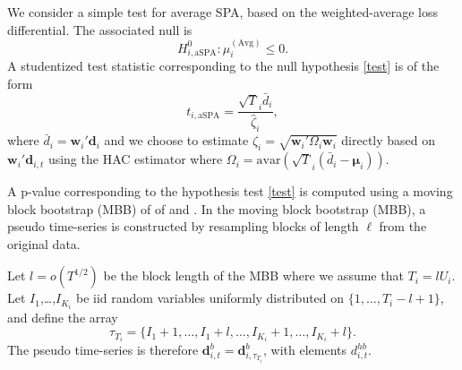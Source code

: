\documentclass[11pt]{article}
\def\mbf#1{\mathbf{#1}} %
\theoremstyle{definition}
\begin{document}
We consider a simple test for average SPA, based on the weighted-average loss differential. The associated null is
\begin{equation} \label{test}
	H_{i,\text{aSPA}}^0: \mu^{(\text{Avg})}_i \leq 0.
\end{equation}
A studentized test statistic corresponding to the null hypothesis \eqref{test} is of the form 
\begin{equation} \label{tstat}
	t_{i,\text{aSPA}} = \frac{\sqrt{T}_i\bar{d}_{i}}{\hat{\zeta}_{i}},
\end{equation}
where $\bar{d}_{i} = \textbf{w}_i'\textbf{d}_{i}$ and we choose to estimate $\zeta_{i} = \sqrt{\textbf{w}_i'\Omega_{i}\textbf{w}_i}$ directly based on $\textbf{w}_i'\textbf{d}_{i,t}$ using the HAC estimator \citep{giacomini2006tests} where $\Omega_{i} = \text{avar}\left(\sqrt{T}_i(\bar{d}_{i} - \mbf{\mu}_{i})\right)$. 

A p-value corresponding to the hypothesis test \eqref{test} is computed using a moving block bootstrap (MBB) of of \cite{kunsch1989jackknife} and \cite{liu1992moving}. In the moving block bootstrap (MBB), a pseudo time-series is constructed by resampling blocks of length $\ell$ from the original data.

Let $l = o(T^{1/2})$ be the block length of the MBB where we assume that $T_i = lU_i$. Let $I_1$,\ldots,$I_{K_i}$ be iid random variables uniformly distributed on $\{1,\ldots,T_i-l+1\}$, and define the array 
$$
  \tau_{T_i} = \{I_1+1, \ldots, I_1+l, \ldots, I_{K_i}+1, \ldots, I_{K_i}+l\}.
$$
The pseudo time-series is therefore $\textbf{d}^b_{i,t} = \textbf{d}^b_{i,\tau_{T_i}}$, with elements $d^{hb}_{i,t}$.
\end{document}
